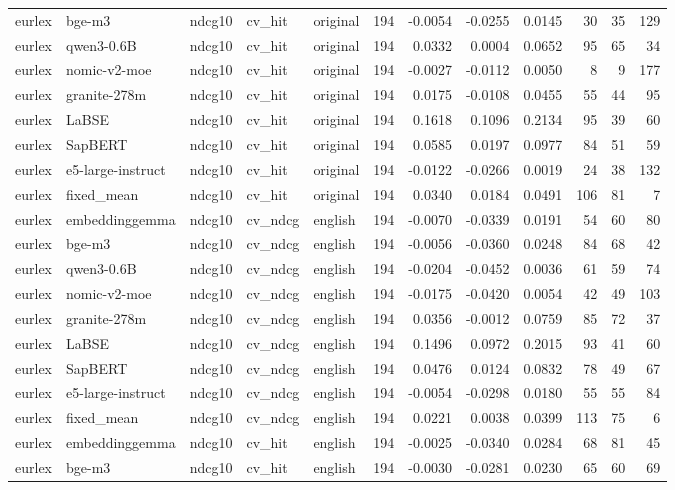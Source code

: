 \begin{tabular}{lllllrrrrrrr}
eurlex & bge-m3 & ndcg10 & cv\_hit & original & 194 & -0.0054 & -0.0255 & 0.0145 & 30 & 35 & 129 \\
eurlex & qwen3-0.6B & ndcg10 & cv\_hit & original & 194 & 0.0332 & 0.0004 & 0.0652 & 95 & 65 & 34 \\
eurlex & nomic-v2-moe & ndcg10 & cv\_hit & original & 194 & -0.0027 & -0.0112 & 0.0050 & 8 & 9 & 177 \\
eurlex & granite-278m & ndcg10 & cv\_hit & original & 194 & 0.0175 & -0.0108 & 0.0455 & 55 & 44 & 95 \\
eurlex & LaBSE & ndcg10 & cv\_hit & original & 194 & 0.1618 & 0.1096 & 0.2134 & 95 & 39 & 60 \\
eurlex & SapBERT & ndcg10 & cv\_hit & original & 194 & 0.0585 & 0.0197 & 0.0977 & 84 & 51 & 59 \\
eurlex & e5-large-instruct & ndcg10 & cv\_hit & original & 194 & -0.0122 & -0.0266 & 0.0019 & 24 & 38 & 132 \\
eurlex & fixed\_mean & ndcg10 & cv\_hit & original & 194 & 0.0340 & 0.0184 & 0.0491 & 106 & 81 & 7 \\
eurlex & embeddinggemma & ndcg10 & cv\_ndcg & english & 194 & -0.0070 & -0.0339 & 0.0191 & 54 & 60 & 80 \\
eurlex & bge-m3 & ndcg10 & cv\_ndcg & english & 194 & -0.0056 & -0.0360 & 0.0248 & 84 & 68 & 42 \\
eurlex & qwen3-0.6B & ndcg10 & cv\_ndcg & english & 194 & -0.0204 & -0.0452 & 0.0036 & 61 & 59 & 74 \\
eurlex & nomic-v2-moe & ndcg10 & cv\_ndcg & english & 194 & -0.0175 & -0.0420 & 0.0054 & 42 & 49 & 103 \\
eurlex & granite-278m & ndcg10 & cv\_ndcg & english & 194 & 0.0356 & -0.0012 & 0.0759 & 85 & 72 & 37 \\
eurlex & LaBSE & ndcg10 & cv\_ndcg & english & 194 & 0.1496 & 0.0972 & 0.2015 & 93 & 41 & 60 \\
eurlex & SapBERT & ndcg10 & cv\_ndcg & english & 194 & 0.0476 & 0.0124 & 0.0832 & 78 & 49 & 67 \\
eurlex & e5-large-instruct & ndcg10 & cv\_ndcg & english & 194 & -0.0054 & -0.0298 & 0.0180 & 55 & 55 & 84 \\
eurlex & fixed\_mean & ndcg10 & cv\_ndcg & english & 194 & 0.0221 & 0.0038 & 0.0399 & 113 & 75 & 6 \\
eurlex & embeddinggemma & ndcg10 & cv\_hit & english & 194 & -0.0025 & -0.0340 & 0.0284 & 68 & 81 & 45 \\
eurlex & bge-m3 & ndcg10 & cv\_hit & english & 194 & -0.0030 & -0.0281 & 0.0230 & 65 & 60 & 69 \\

\end{tabular}
